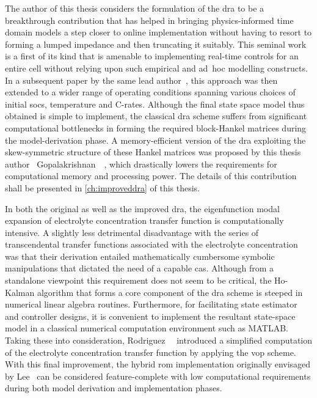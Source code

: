 The author  of this thesis  considers the formulation of  the \gls{dra} to  be a
breakthrough  contribution that  has  helped in  bringing physics-informed  time
domain models a step closer to online implementation without having to resort to
forming a lumped impedance and then truncating it suitably. This seminal work is
a first  of its  kind that  is amenable to  implementing real-time  controls for
an  entire  cell  without  relying  upon such  empirical  and  \mbox{ad hoc}  modelling
constructs. In a  subsequent paper by the same  lead author~\cite{Lee2014}, this
approach was  then extended to  a wider  range of operating  conditions spanning
various  choices  of  initial  \glspl{soc}, temperature  and  C-rates.  Although
the  final  state  space  model  thus  obtained  is  simple  to  implement,  the
classical \gls{dra} scheme suffers from significant computational bottlenecks in
forming the  required block-Hankel  matrices during the  model-derivation phase.
A  memory-efficient  version  of  the \gls{dra}  exploiting  the  skew-symmetric
structure  of  these  Hankel  matrices   was  proposed  by  this  thesis  author
\ie~Gopalakrishnan~\etal{}~\cite{Gopalakrishnan2017},  which drastically  lowers
the requirements for  computational memory and processing power.  The details of
this contribution shall be presented in \cref{ch:improveddra} of this thesis.


In both the original as well  as the improved \gls{dra}, the eigenfunction modal
expansion  of electrolyte  concentration  transfer  function is  computationally
intensive.  A  slightly  less  detrimental   disadvantage  with  the  series  of
transcendental transfer functions associated  with the electrolyte concentration
was   that  their   derivation  entailed   mathematically  cumbersome   symbolic
manipulations that  dictated the need  of a  capable \gls{cas}. Although  from a
standalone  viewpoint  this  requirement  does  not seem  to  be  critical,  the
\mbox{Ho-Kalman}  algorithm  that  forms  a  core  component  of  the  \gls{dra}
scheme  is  steeped  in  numerical linear  algebra  routines.  Furthermore,  for
facilitating  state  estimator  and  controller designs,  it  is  convenient  to
implement the resultant  state-space model in a  classical numerical computation
environment   such  as   \textsc{MATLAB}.  Taking   these  into   consideration,
Rodriguez~\etal{}~\cite{Rodriguez2017}  introduced a  simplified computation  of
the  electrolyte  concentration  transfer  function by  applying  the  \gls{vop}
scheme.  With  this  final  improvement,  the  hybrid  \gls{rom}  implementation
originally envisaged by Lee~\etal{} can  be considered feature-complete with low
computational  requirements  during  both model  derivation  and  implementation
phases.


